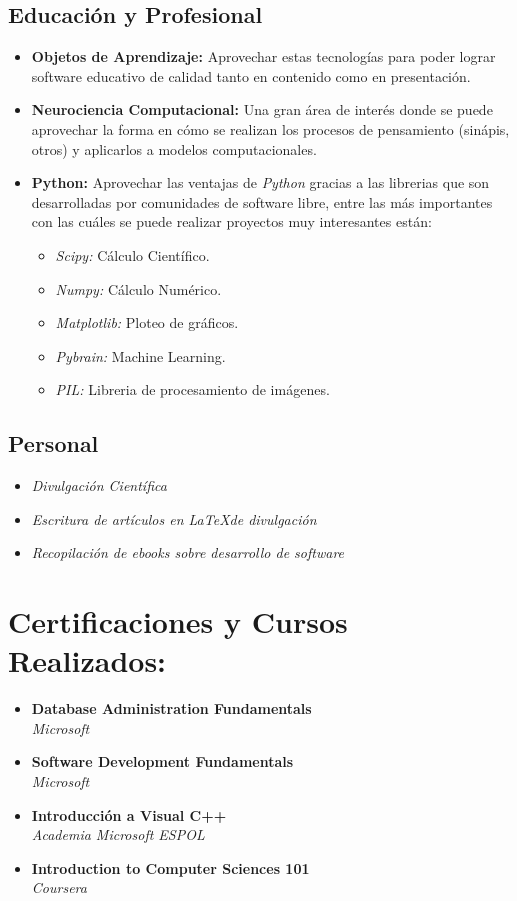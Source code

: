 \documentclass[a4paper,11pt]{article}
\begin{document}
	\subsection{Educación y Profesional}
		\begin{itemize}
			\item \textbf{Objetos de Aprendizaje:} Aprovechar estas tecnologías para poder lograr software educativo de
					calidad tanto en contenido como en presentación.
			\item \textbf{Neurociencia Computacional:} Una gran área de interés donde se puede aprovechar la forma en  	cómo se realizan los procesos de pensamiento (sinápis, otros) y aplicarlos a modelos computacionales.
			\item {\textbf{Python:}} Aprovechar las ventajas de \emph{Python} gracias a las librerias que son desarrolladas por comunidades de software libre, entre las más importantes con las cuáles se puede realizar proyectos muy interesantes están:
				\begin{itemize}
					\item \emph{Scipy:} Cálculo Científico.
					\item \emph{Numpy:} Cálculo Numérico.
					\item \emph{Matplotlib:} Ploteo de gráficos.
					\item \emph{Pybrain:} Machine Learning.
					\item \emph{PIL:} Libreria de procesamiento de imágenes.
				\end{itemize}
		\end{itemize}
	\subsection{Personal} 
		\begin{itemize}	
			\item{\emph{Divulgación Científica}}
			\item{\emph{Escritura de artículos en \LaTeX de divulgación}}
			\item{\emph{Recopilación de ebooks sobre desarrollo de software}}
		\end{itemize}
\newpage
\section{Certificaciones y Cursos Realizados:}		
\noindent
	\begin{itemize}
		\item \textbf{Database Administration Fundamentals} \\
		\emph{Microsoft}
		
		\item \textbf{Software Development Fundamentals} \\
		\emph{Microsoft}
		
		\item \textbf{Introducción a Visual C++} \\
		\emph{Academia Microsoft ESPOL}
		
		\item \textbf{Introduction to Computer Sciences 101} \\
		\emph{Coursera}
	\end{itemize}
\end{document}
